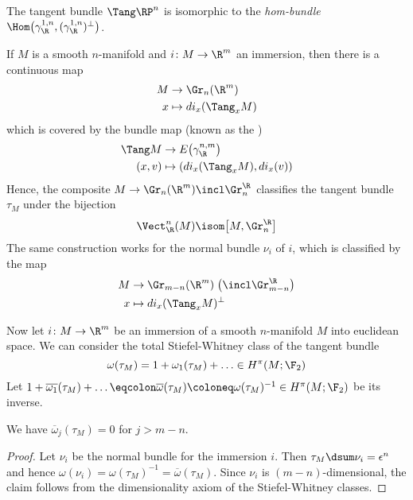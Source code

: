 \begin{corollary}
	The tangent bundle $\Tang \RP^n$ is isomorphic to the \emph{hom-bundle} $\Hom\big(\gamma_\R^{1, n}, (\gamma_\R^{1, n})^\perp\big)$.
\end{corollary}
\begin{remark}
	If $M$ is a smooth $n$-manifold and $i\colon M \to \R^m$ an immersion, then there is a continuous map
	\begin{align*}
		M &\to \Gr_n(\R^m) \\
		x &\mapsto d i_x(\Tang_x M)
	\end{align*}
	which is covered by the bundle map (known as the )
	\begin{align*}
		\Tang M &\to E\big(\gamma_\R^{n, m}\big) \\
		(x, v) &\mapsto (d i_x(\Tang_x M), d i_x(v))
	\end{align*}
	Hence, the composite $M \to \Gr_n(\R^m) \incl \Gr_n^\R$ classifies the tangent bundle $\tau_M$ under the bijection
	\begin{equation*}
		\Vect_\R^n(M) \isom \big[M, \Gr_n^\R\big]
	\end{equation*}
	The same construction works for the normal bundle $\nu_i$ of $i$, which is classified by the map
	\begin{align*}
		M &\to \Gr_{m - n}(\R^m)\;\big(\incl \Gr_{m - n}^\R\big) \\
		x &\mapsto d i_x(\Tang_x M)^\perp
	\end{align*}
\end{remark}

Now let $i\colon M \to \R^m$ be an immersion of a smooth $n$-manifold $M$ into euclidean space.
We can consider the total Stiefel-Whitney class of the tangent bundle
\begin{equation*}
	\omega(\tau_M) = 1 + \omega_1(\tau_M) + \ldots \in H^\pi(M; \F_2)
\end{equation*}
Let $1 + \overline{\omega_1}(\tau_M) + \ldots \eqcolon \overline{\omega}(\tau_M) \coloneq \omega(\tau_M)^{-1} \in H^\pi(M; \F_2)$ be its inverse.
\begin{proposition}\label{prop:vanishingomegainverse}
	We have $\overline{\omega}_j(\tau_M) = 0$ for $j > m - n$.
\end{proposition}
\begin{proof}
	Let $\nu_i$ be the normal bundle for the immersion $i$.
	Then $\tau_M \dsum \nu_i = \epsilon^n$ and hence $\omega(\nu_i) = \omega(\tau_M)^{-1} = \overline{\omega}(\tau_M)$.
	Since $\nu_i$ is $(m - n)$-dimensional, the claim follows from the dimensionality axiom of the Stiefel-Whitney classes.
\end{proof}

